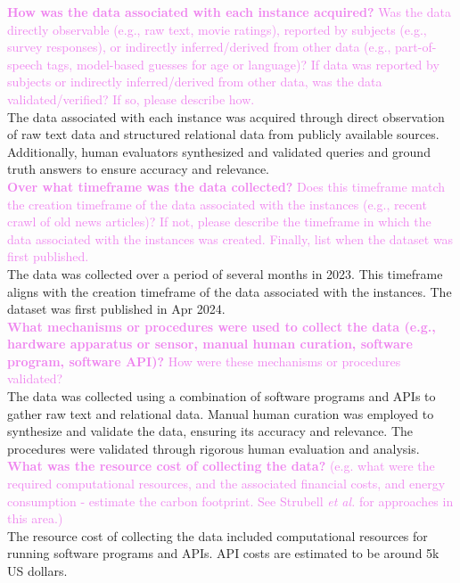 \documentclass{article}
\newcommand{\sectioncolor}{Violet}
\begin{document}
    \textcolor{\sectioncolor}{\textbf{
    How was the data associated with each instance acquired?
    }
    Was the data directly observable (e.g., raw text, movie ratings),
    reported by subjects (e.g., survey responses), or indirectly
    inferred/derived from other data (e.g., part-of-speech tags, model-based
    guesses for age or language)? If data was reported by subjects or
    indirectly inferred/derived from other data, was the data
    validated/verified? If so, please describe how.
    } \\
    The data associated with each instance was acquired through direct observation of raw text data and structured relational data from publicly available sources. Additionally, human evaluators synthesized and validated queries and ground truth answers to ensure accuracy and relevance.\\
    
    \textcolor{\sectioncolor}{\textbf{
    Over what timeframe was the data collected?
    }
    Does this timeframe match the creation timeframe of the data associated
    with the instances (e.g., recent crawl of old news articles)? If not,
    please describe the timeframe in which the data associated with the
    instances was created. Finally, list when the dataset was first published.
    } \\
    The data was collected over a period of several months in 2023. This timeframe aligns with the creation timeframe of the data associated with the instances. The dataset was first published in Apr 2024.\\
    
    \textcolor{\sectioncolor}{\textbf{
    What mechanisms or procedures were used to collect the data (e.g., hardware
    apparatus or sensor, manual human curation, software program, software
    API)?
    }
    How were these mechanisms or procedures validated?
    } \\
    The data was collected using a combination of software programs and APIs to gather raw text and relational data. Manual human curation was employed to synthesize and validate the data, ensuring its accuracy and relevance. The procedures were validated through rigorous human evaluation and analysis.\\
    
    \textcolor{\sectioncolor}{\textbf{
    What was the resource cost of collecting the data?
    }
    (e.g. what were the required computational resources, and the associated
    financial costs, and energy consumption - estimate the carbon footprint.
    See Strubell \textit{et al.}\cite{strubellEnergyPolicyConsiderations2019} for approaches in this area.)
    } \\
    The resource cost of collecting the data included computational resources for running software programs and APIs. API costs are estimated to be around 5k US dollars.\\
    
\end{document}
